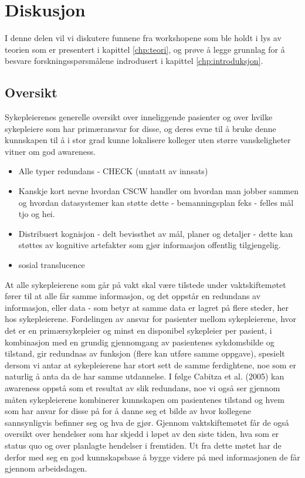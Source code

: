 \chapter{Diskusjon}
\label{chp:diskusjon}
I denne delen vil vi diskutere funnene fra workshopene som ble holdt i lys av teorien som er presentert i kapittel \ref{chp:teori}, og prøve å legge grunnlag for å besvare forskningsspørsmålene indrodusert i kapittel \ref{chp:introduksjon}.

\noindent
\section{Oversikt}
Sykepleierenes generelle oversikt over inneliggende pasienter og over hvilke sykepleiere som har primæransvar for disse, og deres evne til å bruke denne kunnskapen til å i stor grad kunne lokalisere kolleger uten større vanskeligheter vitner om god awareness. 

\noindent
\begin{itemize}
\item Alle typer redundans - CHECK (unntatt av innsats)
\item Kanskje kort nevne hvordan CSCW  handler om hvordan man jobber sammen og hvordan datasystemer kan støtte dette - bemanningsplan feks - felles mål tjo og hei.
\item Distribuert kognisjon - delt bevissthet av mål, planer og detaljer - dette kan støttes av kognitive artefakter som gjør informasjon offentlig tilgjengelig.
\item sosial translucence
\end{itemize}

\noindent
At alle sykepleierene som går på vakt skal være tilstede under vaktskiftemøtet fører til at alle får samme informasjon, og det oppstår en redundans av informasjon, eller data - som betyr at samme data er lagret på flere steder, her hos sykepleierene. Fordelingen av ansvar for pasienter mellom sykepleierene, hvor det er en primærsykepleier og minst en disponibel sykepleier per pasient, i kombinasjon med en grundig gjennomgang av pasientenes sykdomsbilde og tilstand, gir redundnas av funksjon (flere kan utføre samme oppgave), spesielt dersom vi antar at sykepleierene har stort sett de samme ferdightene, noe som er naturlig å anta da de har samme utdannelse. I følge Cabitza et al. (2005) kan awareness oppstå som et resultat av slik redundans, noe vi også ser gjennom måten sykepleierene kombinerer kunnskapen om pasientenes tilstand og hvem som har anvar for disse på for å danne seg et bilde av hvor kollegene sannsynligvis befinner seg og hva de gjør.
Gjennom vaktskiftemøtet får de også oversikt over hendelser som har skjedd i løpet av den siste tiden, hva som er status quo og over planlagte hendelser i fremtiden. Ut fra dette møtet har de derfor med seg en god kunnskapsbase å bygge videre på med informasjonen de får gjennom arbeidsdagen. 

